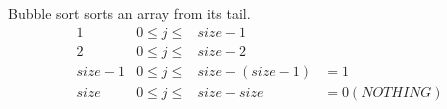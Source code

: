 Bubble sort sorts an array from its tail.
$$
\begin{array}{ll}
1     & 0 \le j \le & size - 1 \\
2     & 0 \le j \le & size - 2 \\
size-1& 0 \le j \le & size - (size-1) & = 1 \\
size  & 0 \le j \le & size - size & = 0 (NOTHING)
\end{array}
$$
